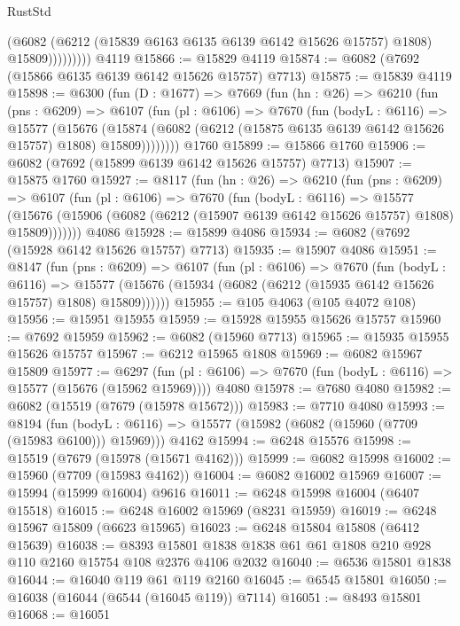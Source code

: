 \begin{lexlean}{RustStd}
\begin{coremodule}
                    (@6082
                      (@6212 (@15839 @6163 @6135 @6139 @6142 @15626 @15757) @1808)
                      @15809)))))))))
    @4119
@15866 := @15829 @4119
@15874 := @6082 (@7692 (@15866 @6135 @6139 @6142 @15626 @15757) @7713)
@15875 := @15839 @4119
@15898 := @6300
    (fun (D : @1677) =>
    @7669
      (fun (hn : @26) =>
      @6210
        (fun (pns : @6209) =>
        @6107
          (fun (pl : @6106) =>
          @7670
            (fun (bodyL : @6116) =>
            @15577
              (@15676
                (@15874 (@6082 (@6212 (@15875 @6135 @6139 @6142 @15626 @15757) @1808) @15809))))))))
    @1760
@15899 := @15866 @1760
@15906 := @6082 (@7692 (@15899 @6139 @6142 @15626 @15757) @7713)
@15907 := @15875 @1760
@15927 := @8117
    (fun (hn : @26) =>
    @6210
      (fun (pns : @6209) =>
      @6107
        (fun (pl : @6106) =>
        @7670
          (fun (bodyL : @6116) =>
          @15577
            (@15676 (@15906 (@6082 (@6212 (@15907 @6139 @6142 @15626 @15757) @1808) @15809)))))))
    @4086
@15928 := @15899 @4086
@15934 := @6082 (@7692 (@15928 @6142 @15626 @15757) @7713)
@15935 := @15907 @4086
@15951 := @8147
    (fun (pns : @6209) =>
    @6107
      (fun (pl : @6106) =>
      @7670
        (fun (bodyL : @6116) =>
        @15577 (@15676 (@15934 (@6082 (@6212 (@15935 @6142 @15626 @15757) @1808) @15809))))))
@15955 := @105 @4063 (@105 @4072 @108)
@15956 := @15951 @15955
@15959 := @15928 @15955 @15626 @15757
@15960 := @7692 @15959
@15962 := @6082 (@15960 @7713)
@15965 := @15935 @15955 @15626 @15757
@15967 := @6212 @15965 @1808
@15969 := @6082 @15967 @15809
@15977 := @6297
    (fun (pl : @6106) => @7670 (fun (bodyL : @6116) => @15577 (@15676 (@15962 @15969))))
    @4080
@15978 := @7680 @4080
@15982 := @6082 (@15519 (@7679 (@15978 @15672)))
@15983 := @7710 @4080
@15993 := @8194
    (fun (bodyL : @6116) => @15577 (@15982 (@6082 (@15960 (@7709 (@15983 @6100))) @15969)))
    @4162
@15994 := @6248 @15576
@15998 := @15519 (@7679 (@15978 (@15671 @4162)))
@15999 := @6082 @15998
@16002 := @15960 (@7709 (@15983 @4162))
@16004 := @6082 @16002 @15969
@16007 := @15994 (@15999 @16004) @9616
@16011 := @6248 @15998 @16004 (@6407 @15518)
@16015 := @6248 @16002 @15969 (@8231 @15959)
@16019 := @6248 @15967 @15809 (@6623 @15965)
@16023 := @6248 @15804 @15808 (@6412 @15639)
@16038 := @8393 @15801 @1838 @1838 @61 @61 @1808 @210 @928 @110 @2160 @15754 @108 @2376 @4106 @2032
@16040 := @6536 @15801 @1838
@16044 := @16040 @119 @61 @119 @2160
@16045 := @6545 @15801
@16050 := @16038 (@16044 (@6544 (@16045 @119)) @7114)
@16051 := @8493 @15801
@16068 := @16051

\end{coremodule}
\end{lexlean}
